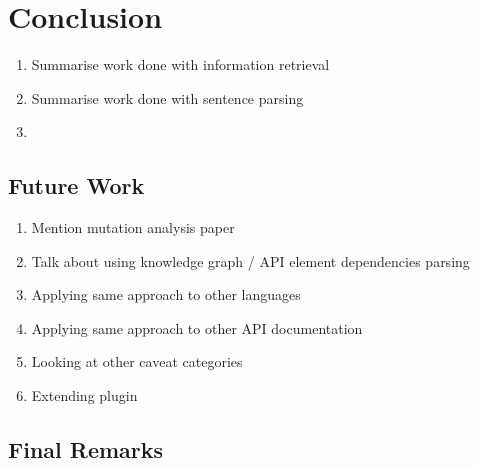 \chapter{Conclusion}
\label{cha:conc}

\begin{enumerate}
	\item Summarise work done with information retrieval
	\item Summarise work done with sentence parsing
	\item 
\end{enumerate}

\section{Future Work}
\label{sec:future}

\begin{enumerate}
	\item Mention mutation analysis paper 
	\item Talk about using knowledge graph / API element dependencies parsing
	\item Applying same approach to other languages
	\item Applying same approach to other API documentation
	\item Looking at other caveat categories
	\item Extending plugin
\end{enumerate}

\section{Final Remarks}
